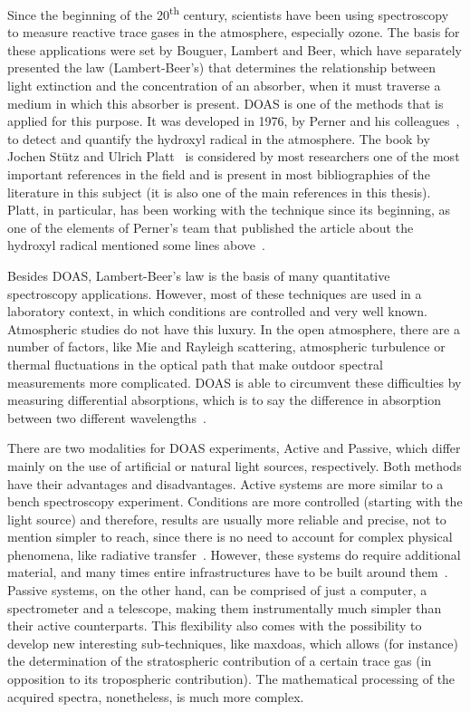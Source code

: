 Since the beginning of the 20\textsuperscript{th} century, scientists
have been using spectroscopy to measure reactive trace gases in the
atmosphere, especially ozone. The basis for these applications were set
by Bouguer, Lambert and Beer, which have separately presented the law
(Lambert-Beer's) that determines the relationship between light
extinction and the concentration of an absorber, when it must traverse a
medium in which this absorber is present. \gls{DOAS} is one of the
methods that is applied for this purpose. It was developed in 1976, by
Perner and his colleagues~\cite{Perner1976}, to detect and quantify the
hydroxyl radical in the atmosphere. The book by Jochen Stütz and Ulrich
Platt~\cite{Platt2007} is considered by most researchers one of the most
important references in the field and is present in most bibliographies
of the literature in this subject (it is also one of the main references
in this thesis). Platt, in particular, has been working with the
technique since its beginning, as one of the elements of Perner's team
that published the article about the hydroxyl radical mentioned some
lines above~\cite{Perner1976}.

Besides \gls{DOAS}, Lambert-Beer's law is the basis of many quantitative
spectroscopy applications. However, most of these techniques are used in
a laboratory context, in which conditions are controlled and very well
known. Atmospheric studies do not have this luxury. In the open
atmosphere, there are a number of factors, like Mie and Rayleigh
scattering, atmospheric turbulence or thermal fluctuations in the
optical path that make outdoor spectral measurements more complicated.
\gls{DOAS} is able to circumvent these difficulties by measuring
differential absorptions, which is to say the difference in absorption
between two different wavelengths~\cite{Platt2007, Merlaud2013}.

There are two modalities for \gls{DOAS} experiments, Active and Passive,
which differ mainly on the use of artificial or natural light sources,
respectively. Both methods have their advantages and disadvantages.
Active systems are more similar to a bench spectroscopy experiment.
Conditions are more controlled (starting with the light source) and
therefore, results are usually more reliable and precise, not to mention
simpler to reach, since there is no need to account for complex physical
phenomena, like radiative transfer~\cite{Platt2007}. However, these
systems do require additional material, and many times entire
infrastructures have to be built around them~\cite{Pundt2005}. Passive
systems, on the other hand, can be comprised of just a computer, a
spectrometer and a telescope, making them instrumentally much simpler
than their active counterparts. This flexibility also comes with the
possibility to develop new interesting sub-techniques, like
\gls{maxdoas}, which allows (for instance) the determination of the
stratospheric contribution of a certain trace gas (in opposition to its
tropospheric contribution). The mathematical processing of the acquired
spectra, nonetheless, is much more complex.

